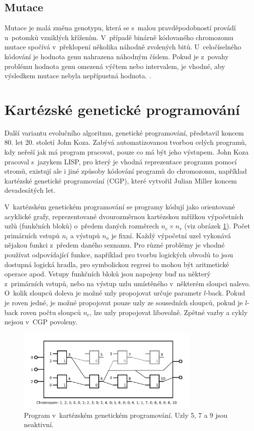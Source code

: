 \subsection{Mutace}

Mutace je malá změna genotypu, která se s~malou pravděpodobností provádí u~potomků vzniklých křížením. V~případě binárně kódovaného chromozomu mutace spočívá v~překlopení několika náhodně zvolených bitů. U~celočíselného kódování je hodnota genu nahrazena náhodným číslem. Pokud je z~povahy problému hodnota genu omezená výčtem nebo intervalem, je vhodné, aby výsledkem mutace nebyla nepřípustná hodnota. \cite{Modra}.

\section{Kartézské genetické programování}
\label{secCGP}

Další variantu evolučního algoritmu, genetické programování, představil koncem 80. let 20. století John Koza. Zabývá automatizovanou tvorbou celých programů, kdy neřeší jak má program pracovat, pouze co má být jeho výstupem. John Koza pracoval s~jazykem LISP, pro který je vhodná reprezentace programu pomocí stromů, existují ale i jiné způsoby kódování programů do chromozomu, například kartézské genetické programování (CGP), které vytvořil Julian Miller koncem devadesátých let.

V~kartézském genetickém programování se programy kódují jako orientované acyklické grafy, reprezentované dvourozměrnou kartézskou mřížkou výpočetních uzlů (funkčních bloků) o~předem daných rozměrech $n_c \times n_r$ (viz obrázek \ref{obrCGP}). Počet primárních vstupů $n_i$ a výstupů $n_o$ je fixní. Každý výpočetní uzel vykonává nějakou funkci z~předem daného seznamu. Pro různé problémy je vhodné používat odpovídající funkce, například pro tvorbu logických obvodů to jsou dostupná logická hradla, pro symbolickou regresi to mohou být aritmetické operace apod. Vstupy funkčních bloků jsou napojeny buď na některý z~primárních vstupů, nebo na výstup uzlu umístěného v~některém sloupci nalevo. O~kolik sloupců doleva je možné uzly propojovat určuje parametr $l$-back. Pokud je roven jedné, je možné propojovat pouze uzly ze sousedních sloupců, pokud je $l$-back roven počtu sloupců $n_c$, lze uzly propojovat libovolně. Zpětné vazby a cykly nejsou v~CGP povoleny.

\begin{figure}[htb]
    \centering\includegraphics[width=0.8\textwidth]{fig/cgp.pdf}
    \caption{Program v~kartézském genetickém programování. Uzly 5, 7 a 9 jsou neaktivní.}
    \label{obrCGP}
\end{figure}

